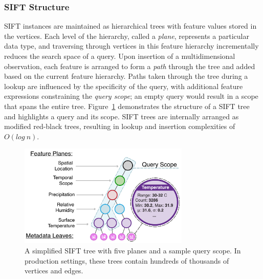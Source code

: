\documentclass[9pt,journal,compsoc]{IEEEtran}
\begin{document}
\subsubsection{SIFT Structure}
\label{sec:sift}
SIFT instances are maintained as hierarchical trees with feature values stored in the vertices. Each level of the hierarchy, called a \emph{plane}, represents a particular data type, and traversing through vertices in this feature hierarchy incrementally reduces the search space of a query. Upon insertion of a multidimensional observation, each feature is arranged to form a \emph{path} through the tree and added based on the current feature hierarchy. Paths taken through the tree during a lookup are influenced by the specificity of the query, with additional feature expressions constraining the \emph{query scope}; an empty query would result in a scope that spans the entire tree. Figure~\ref{fig:sketch} demonstrates the structure of a SIFT tree and highlights a query and its scope. SIFT trees are internally arranged as modified red-black trees, resulting in lookup and insertion complexities of $O(log\ n)$.

\begin{figure}[b!]
    \centerline{\includegraphics[width=3.2in]{figures/sketch.pdf}}
    \caption{A simplified SIFT tree with five planes and a sample query scope. In production settings, these trees contain hundreds of thousands of vertices and edges.}
    \label{fig:sketch}
\end{figure}
\end{document}
